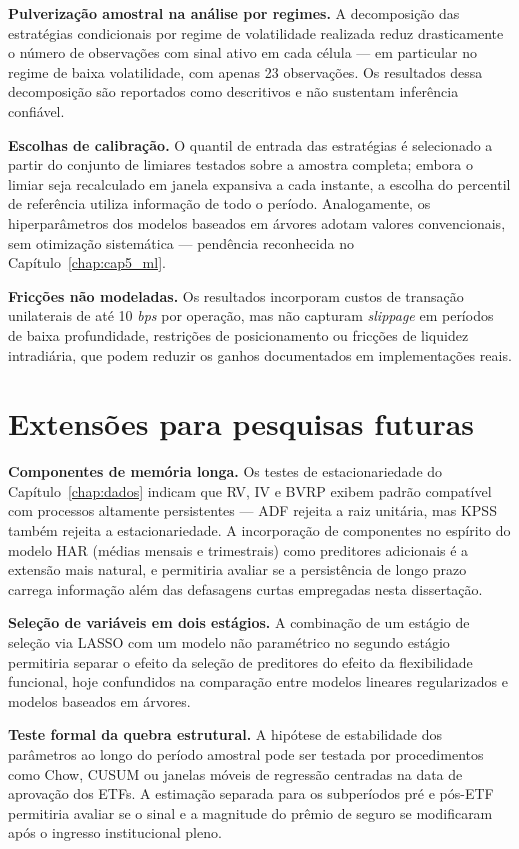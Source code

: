 \textbf{Pulverização amostral na análise por regimes.} A decomposição das estratégias condicionais por regime de volatilidade realizada reduz drasticamente o número de observações com sinal ativo em cada célula --- em particular no regime de baixa volatilidade, com apenas 23 observações. Os resultados dessa decomposição são reportados como descritivos e não sustentam inferência confiável.

\textbf{Escolhas de calibração.} O quantil de entrada das estratégias é selecionado a partir do conjunto de limiares testados sobre a amostra completa; embora o limiar seja recalculado em janela expansiva a cada instante, a escolha do percentil de referência utiliza informação de todo o período. Analogamente, os hiperparâmetros dos modelos baseados em árvores adotam valores convencionais, sem otimização sistemática --- pendência reconhecida no Capítulo~\ref{chap:cap5_ml}.

\textbf{Fricções não modeladas.} Os resultados incorporam custos de transação unilaterais de até 10 \emph{bps} por operação, mas não capturam \emph{slippage} em períodos de baixa profundidade, restrições de posicionamento ou fricções de liquidez intradiária, que podem reduzir os ganhos documentados em implementações reais.

\section{Extensões para pesquisas futuras}
\label{sec:conclusao_extensoes}

\textbf{Componentes de memória longa.} Os testes de estacionariedade do Capítulo~\ref{chap:dados} indicam que RV, IV e BVRP exibem padrão compatível com processos altamente persistentes --- ADF rejeita a raiz unitária, mas KPSS também rejeita a estacionariedade. A incorporação de componentes no espírito do modelo HAR (médias mensais e trimestrais) como preditores adicionais é a extensão mais natural, e permitiria avaliar se a persistência de longo prazo carrega informação além das defasagens curtas empregadas nesta dissertação.

\textbf{Seleção de variáveis em dois estágios.} A combinação de um estágio de seleção via LASSO com um modelo não paramétrico no segundo estágio permitiria separar o efeito da seleção de preditores do efeito da flexibilidade funcional, hoje confundidos na comparação entre modelos lineares regularizados e modelos baseados em árvores.

\textbf{Teste formal da quebra estrutural.} A hipótese de estabilidade dos parâmetros ao longo do período amostral pode ser testada por procedimentos como Chow, CUSUM ou janelas móveis de regressão centradas na data de aprovação dos ETFs. A estimação separada para os subperíodos pré e pós-ETF permitiria avaliar se o sinal e a magnitude do prêmio de seguro se modificaram após o ingresso institucional pleno.

